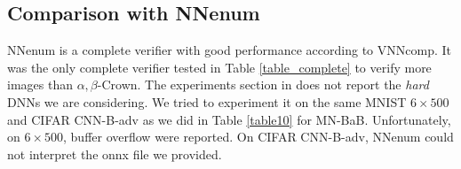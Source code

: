 	\subsection*{Comparison with NNenum}

NNenum \cite{nnenum} is a complete verifier with good performance according to VNNcomp.
It was the only complete verifier tested in Table \ref{table_complete} to verify more images than $\alpha,\beta$-Crown. The experiments section in \cite{nnenum} does not report
the {\em hard} DNNs we are considering. We tried to experiment it on the same MNIST 
$6 \times 500$ and CIFAR CNN-B-adv as we did in Table \ref{table10} for MN-BaB. Unfortunately, on $6 \times 500$, buffer overflow were reported.
On CIFAR CNN-B-adv, NNenum could not interpret the onnx file we provided.



